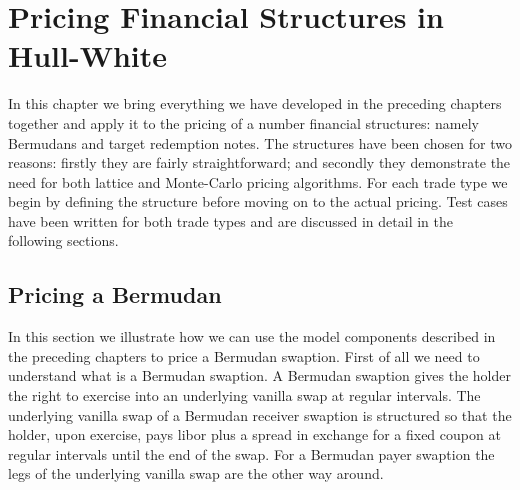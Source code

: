\chapter{Pricing Financial Structures in Hull-White}\label{ch:pricing-berms-and-tarns}

In this chapter we bring everything we have developed in the preceding chapters together and apply it to the pricing of 
a number financial structures: namely Bermudans and target redemption notes. The structures have been chosen for two reasons: 
firstly they are fairly straightforward; and secondly they demonstrate the need for both lattice and Monte-Carlo pricing algorithms. 
For each trade type we begin by defining the structure before moving on to the actual pricing. Test cases have been written for both trade types 
and are discussed in detail in the following sections.  

\section{Pricing a Bermudan} 

In this section we illustrate how we can use the model components described in the preceding chapters to price a
Bermudan swaption. First of all we need to understand what is a Bermudan swaption. A Bermudan swaption gives the holder 
the right to exercise into an underlying vanilla swap at regular intervals. The underlying vanilla swap of a Bermudan receiver 
swaption is structured so that the holder, upon exercise, pays libor plus a spread in exchange for a fixed coupon at regular 
intervals until the end of the swap. For a Bermudan payer swaption the legs of the underlying vanilla swap are the other way around. 


